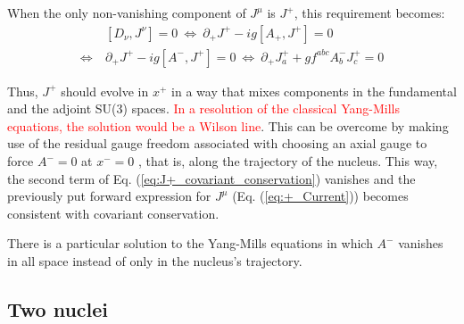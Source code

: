When the only non-vanishing component of $J^\mu$ is $J^+$, this requirement becomes:
\begin{equation}
\begin{split}
	& [D_\nu, J^\nu] = 0 ~ \Leftrightarrow ~ \partial_+ J^+ -ig [A_+, J^+] = 0 \\ \Leftrightarrow ~ & \partial_+ J^+ -ig [A^-, J^+] = 0 ~ \Leftrightarrow ~ \partial_+ J^+_a + g f^{abc}A^-_b J^+_c = 0
\end{split}
\label{eq:J+_covariant_conservation}
\end{equation}

Thus, $J^+$ should evolve in $x^+$ in a way that mixes components in the fundamental and the adjoint SU(3) spaces. \textcolor{red}{In a resolution of the classical Yang-Mills equations, the solution would be a Wilson line}. This can be overcome by making use of the residual gauge freedom associated with choosing an axial gauge to force $A^- = 0$ at $x^-=0$ \citep{Kovner_1995}, that is, along the trajectory of the nucleus. This way, the second term of Eq. (\ref{eq:J+_covariant_conservation}) vanishes and the previously put forward expression for $J^\mu$ (Eq. (\ref{eq:+_Current})) becomes consistent with covariant conservation.

There is a particular solution to the Yang-Mills equations in which $A^-$ vanishes in all space instead of only in the nucleus's trajectory. \citep{Kovner_1995}


\subsection{Two nuclei}



